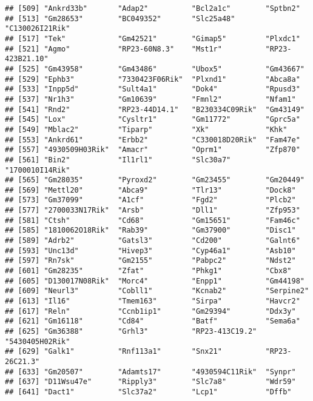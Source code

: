 \documentclass[
]{article}
\begin{document}
\begin{verbatim}
## [509] "Ankrd33b"       "Adap2"          "Bcl2a1c"        "Sptbn2"        
## [513] "Gm28653"        "BC049352"       "Slc25a48"       "C130026I21Rik" 
## [517] "Tek"            "Gm42521"        "Gimap5"         "Plxdc1"        
## [521] "Agmo"           "RP23-60N8.3"    "Mst1r"          "RP23-423B21.10"
## [525] "Gm43958"        "Gm43486"        "Ubox5"          "Gm43667"       
## [529] "Ephb3"          "7330423F06Rik"  "Plxnd1"         "Abca8a"        
## [533] "Inpp5d"         "Sult4a1"        "Dok4"           "Rpusd3"        
## [537] "Nr1h3"          "Gm10639"        "Fmnl2"          "Nfam1"         
## [541] "Rnd2"           "RP23-44D14.1"   "B230334C09Rik"  "Gm43149"       
## [545] "Lox"            "Cysltr1"        "Gm11772"        "Gprc5a"        
## [549] "Mblac2"         "Tiparp"         "Xk"             "Khk"           
## [553] "Ankrd61"        "Erbb2"          "C330018D20Rik"  "Fam47e"        
## [557] "4930509H03Rik"  "Amacr"          "Oprm1"          "Zfp870"        
## [561] "Bin2"           "Il1rl1"         "Slc30a7"        "1700010I14Rik" 
## [565] "Gm28035"        "Pyroxd2"        "Gm23455"        "Gm20449"       
## [569] "Mettl20"        "Abca9"          "Tlr13"          "Dock8"         
## [573] "Gm37099"        "A1cf"           "Fgd2"           "Plcb2"         
## [577] "2700033N17Rik"  "Arsb"           "Dll1"           "Zfp953"        
## [581] "Ctsh"           "Cd68"           "Gm15651"        "Fam46c"        
## [585] "1810062O18Rik"  "Rab39"          "Gm37900"        "Disc1"         
## [589] "Adrb2"          "Gatsl3"         "Cd200"          "Galnt6"        
## [593] "Unc13d"         "Hivep3"         "Cyp46a1"        "Asb10"         
## [597] "Rn7sk"          "Gm2155"         "Pabpc2"         "Ndst2"         
## [601] "Gm28235"        "Zfat"           "Phkg1"          "Cbx8"          
## [605] "D130017N08Rik"  "Morc4"          "Enpp1"          "Gm44198"       
## [609] "Neurl3"         "Cobll1"         "Kcnab2"         "Serpine2"      
## [613] "Il16"           "Tmem163"        "Sirpa"          "Havcr2"        
## [617] "Reln"           "Ccnb1ip1"       "Gm29394"        "Ddx3y"         
## [621] "Gm16118"        "Cd84"           "Batf"           "Sema6a"        
## [625] "Gm36388"        "Grhl3"          "RP23-413C19.2"  "5430405H02Rik" 
## [629] "Galk1"          "Rnf113a1"       "Snx21"          "RP23-26C21.3"  
## [633] "Gm20507"        "Adamts17"       "4930594C11Rik"  "Synpr"         
## [637] "D11Wsu47e"      "Ripply3"        "Slc7a8"         "Wdr59"         
## [641] "Dact1"          "Slc37a2"        "Lcp1"           "Dffb"          

\end{verbatim}
\end{document}
